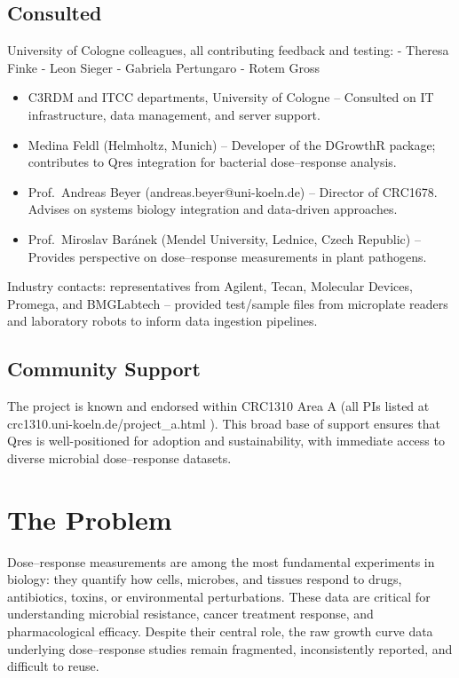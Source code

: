 \documentclass[
]{article}
\providecommand{\tightlist}{%
  \setlength{\itemsep}{0pt}\setlength{\parskip}{0pt}}
\begin{document}
\subsection{Consulted}\label{consulted}

University of Cologne colleagues, all contributing feedback and testing:
- Theresa Finke - Leon Sieger - Gabriela Pertungaro - Rotem Gross

\begin{itemize}
\tightlist
\item
  C3RDM and ITCC departments, University of Cologne -- Consulted on IT
  infrastructure, data management, and server support.
\item
  Medina Feldl (Helmholtz, Munich) -- Developer of the DGrowthR package;
  contributes to Qres integration for bacterial dose--response analysis.
\item
  Prof.~Andreas Beyer (andreas.beyer@uni-koeln.de) -- Director of
  CRC1678. Advises on systems biology integration and data-driven
  approaches.
\item
  Prof.~Miroslav Baránek (Mendel University, Lednice, Czech Republic) --
  Provides perspective on dose--response measurements in plant
  pathogens.
\end{itemize}

Industry contacts: representatives from Agilent, Tecan, Molecular
Devices, Promega, and BMGLabtech -- provided test/sample files from
microplate readers and laboratory robots to inform data ingestion
pipelines.

\subsection{Community Support}\label{community-support}

The project is known and endorsed within CRC1310 Area A (all PIs listed
at crc1310.uni-koeln.de/project\_a.html ). This broad base of support
ensures that Qres is well-positioned for adoption and sustainability,
with immediate access to diverse microbial dose--response datasets.

\section{The Problem}\label{the-problem}

Dose--response measurements are among the most fundamental experiments
in biology: they quantify how cells, microbes, and tissues respond to
drugs, antibiotics, toxins, or environmental perturbations. These data
are critical for understanding microbial resistance, cancer treatment
response, and pharmacological efficacy. Despite their central role, the
raw growth curve data underlying dose--response studies remain
fragmented, inconsistently reported, and difficult to reuse.
\end{document}
